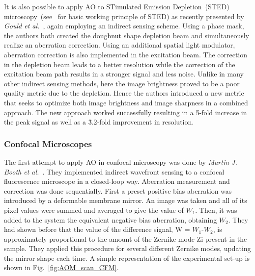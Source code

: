 It is also possible to apply AO to STimulated Emission Depletion~(STED) microscopy~(see~\cite{scan_STED_principle} for basic working principle of STED) as recently presented by \emph{Gould et al.}~\cite{scan_STED}, again employing an indirect sensing scheme. Using a phase mask, the authors both created the doughnut shape depletion beam and simultaneously realize an aberration correction. Using an additional spatial light modulator, aberration correction is also implemented in the  excitation beam. The correction in the depletion beam leads to a better resolution while the correction of the excitation beam path results in a stronger signal and less noise. Unlike in many other indirect sensing methods, here the image brightness proved to be a poor quality metric due to the depletion. Hence the authors  introduced a new metric that seeks to optimize both image brightness and image sharpness in a combined approach. The new approach worked successfully resulting in a \~5-fold increase in the peak signal as well as a \~3.2-fold improvement in resolution.


\subsubsection{Confocal Microscopes}
\label{sec:ConfocalMicroscopes}

The first attempt to apply AO in confocal microscopy was done by \textit{Martin J. Booth et al.}~\cite{scan_CFM}. They implemented indirect wavefront sensing to a confocal fluorescence microscope in a closed-loop way. Aberration measurement and correction was done sequentially. First a preset positive bias aberration was introduced by a deformable membrane mirror. An image was taken and all of its pixel values were summed and averaged to give the value of $W_1$. Then, it was added to the system the equivalent negative bias aberration, obtaining $W_2$. They had shown before that the value of the difference signal, W = $W_1$-$W_2$, is approximately proportional to the amount of the Zernike mode Zi present in the sample. They applied this procedure for several different Zernike modes, updating the mirror shape each time. A simple representation of the experimental set-up is shown in Fig.~\ref{fig:AOM_scan_CFM}.

